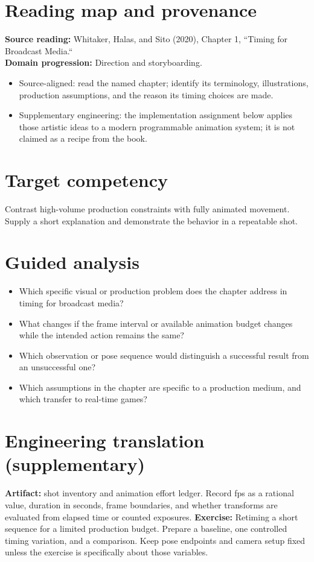 \documentclass[10pt,letterpaper]{article}
\begin{document}
\makedoctitle
\makedocsummary

\section{Reading map and provenance}
\textbf{Source reading:} Whitaker, Halas, and Sito (2020), Chapter 1, ``Timing for Broadcast Media.``\\
\textbf{Domain progression:} Direction and storyboarding.
\begin{itemize}
\item Source-aligned: read the named chapter; identify its terminology, illustrations, production assumptions, and the reason its timing choices are made.
\item Supplementary engineering: the implementation assignment below applies those artistic ideas to a modern programmable animation system; it is not claimed as a recipe from the book.
\end{itemize}
\section{Target competency}
Contrast high-volume production constraints with fully animated movement. Supply a short explanation and demonstrate the behavior in a repeatable shot.
\section{Guided analysis}
\begin{itemize}
\item Which specific visual or production problem does the chapter address in timing for broadcast media?
\item What changes if the frame interval or available animation budget changes while the intended action remains the same?
\item Which observation or pose sequence would distinguish a successful result from an unsuccessful one?
\item Which assumptions in the chapter are specific to a production medium, and which transfer to real-time games?
\end{itemize}
\section{Engineering translation (supplementary)}
\textbf{Artifact:} shot inventory and animation effort ledger. Record fps as a rational value, duration in seconds, frame boundaries, and whether transforms are evaluated from elapsed time or counted exposures.
\textbf{Exercise:} Retiming a short sequence for a limited production budget. Prepare a baseline, one controlled timing variation, and a comparison. Keep pose endpoints and camera setup fixed unless the exercise is specifically about those variables.
\end{document}
